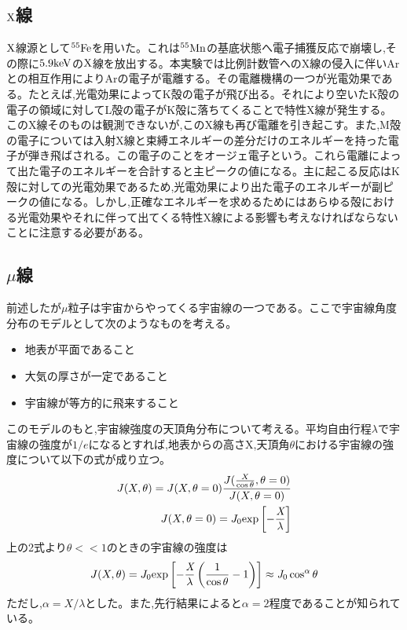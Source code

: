 \documentclass[a4j]{jsarticle}
\begin{document}
	\subsection{$\rm{X}$線}
	$\rm{X}$線源として$\rm{^{55}Fe}$を用いた。これは$\rm{^{55}Mn}$の基底状態へ電子捕獲反応で崩壊し,その際に$5.9\rm{keV}$の$\rm{X}$線を放出する。本実験では比例計数管へのX線の侵入に伴いArとの相互作用によりArの電子が電離する。その電離機構の一つが光電効果である。たとえば,光電効果によってK殻の電子が飛び出る。それにより空いたK殻の電子の領域に対してL殻の電子がK殻に落ちてくることで特性X線が発生する。このX線そのものは観測できないが,このX線も再び電離を引き起こす。また,M殻の電子については入射X線と束縛エネルギーの差分だけのエネルギーを持った電子が弾き飛ばされる。この電子のことをオージェ電子という。これら電離によって出た電子のエネルギーを合計すると主ピークの値になる。主に起こる反応はK殻に対しての光電効果であるため,光電効果により出た電子のエネルギーが副ピークの値になる。しかし,正確なエネルギーを求めるためにはあらゆる殻における光電効果やそれに伴って出てくる特性X線による影響も考えなければならないことに注意する必要がある。
		
	\subsection{$\mu$線}
	前述したが$\mu$粒子は宇宙からやってくる宇宙線の一つである。ここで宇宙線角度分布のモデルとして次のようなものを考える。
	\begin{itemize}
	\item 地表が平面であること
	\item 大気の厚さが一定であること
	\item 宇宙線が等方的に飛来すること
	\end{itemize}
	このモデルのもと,宇宙線強度の天頂角分布について考える。平均自由行程$\lambda$で宇宙線の強度が$1/e$になるとすれば,地表からの高さX,天頂角$\theta$における宇宙線の強度について以下の式が成り立つ。
	\begin{eqnarray}
	J(X,\theta) = J(X,\theta = 0) \frac{J(\frac{X}{\cos\theta},\theta = 0)}{J(X,\theta = 0)} \\
	J(X,\theta = 0) = J_{0} \rm{exp} \left[ -\frac{\textit{X}}{\lambda} \right]
	\end{eqnarray}
	上の2式より$\theta<<1$のときの宇宙線の強度は
	\begin{equation}
	J(X,\theta) = J_{0} \rm{exp}  \left[ -\frac{\textit{X}}{\lambda} \left( \frac{1}{\cos \theta} -1 \right) \right]  \approx \textit{J}_{0} \cos^{\alpha} \theta
	\end{equation}
	ただし,$\alpha=X/\lambda$とした。また,先行結果によると$\alpha=2$程度であることが知られている。
	
\end{document}
